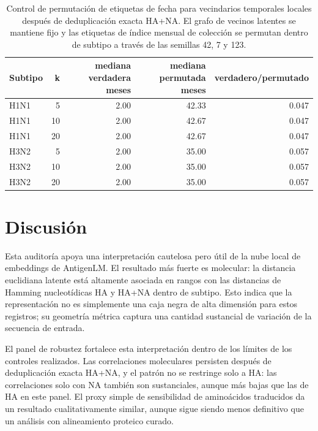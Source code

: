 \documentclass[11pt]{article}
\begin{document}
\begin{table}[H]
\centering
\caption{Control de permutación de etiquetas de fecha para vecindarios temporales locales después de deduplicación exacta HA+NA. El grafo de vecinos latentes se mantiene fijo y las etiquetas de índice mensual de colección se permutan dentro de subtipo a través de las semillas 42, 7 y 123.}
\label{tab:temporal-permutation}
\begin{tabular}{lrrrr}
\toprule
Subtipo & k & mediana verdadera meses & mediana permutada meses & verdadero/permutado \\
\midrule
H1N1 & 5 & 2.00 & 42.33 & 0.047 \\
H1N1 & 10 & 2.00 & 42.67 & 0.047 \\
H1N1 & 20 & 2.00 & 42.67 & 0.047 \\
H3N2 & 5 & 2.00 & 35.00 & 0.057 \\
H3N2 & 10 & 2.00 & 35.00 & 0.057 \\
H3N2 & 20 & 2.00 & 35.00 & 0.057 \\
\bottomrule
\end{tabular}
\end{table}

\section{Discusión}

Esta auditoría apoya una interpretación cautelosa pero útil de la nube local de embeddings de AntigenLM. El resultado más fuerte es molecular: la distancia euclidiana latente está altamente asociada en rangos con las distancias de Hamming nucleotídicas HA y HA+NA dentro de subtipo. Esto indica que la representación no es simplemente una caja negra de alta dimensión para estos registros; su geometría métrica captura una cantidad sustancial de variación de la secuencia de entrada.

El panel de robustez fortalece esta interpretación dentro de los límites de los controles realizados. Las correlaciones moleculares persisten después de deduplicación exacta HA+NA, y el patrón no se restringe solo a HA: las correlaciones solo con NA también son sustanciales, aunque más bajas que las de HA en este panel. El proxy simple de sensibilidad de aminoácidos traducidos da un resultado cualitativamente similar, aunque sigue siendo menos definitivo que un análisis con alineamiento proteico curado.
\end{document}
